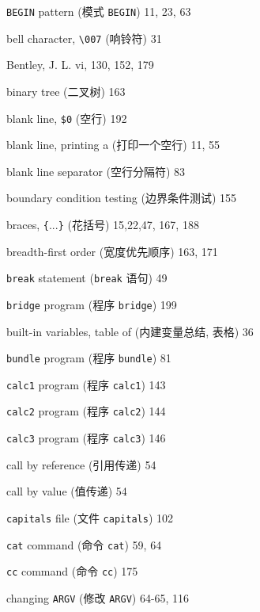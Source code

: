 \begin{multicols}{2}
\hangindent=2pc  \verb'BEGIN' pattern (模式 \verb'BEGIN') 11, 23, 63

\hangindent=2pc  bell character, \verb'\007' (响铃符) 31

\hangindent=2pc  Bentley, J. L. vi, 130, 152, 179

\hangindent=2pc  binary tree (二叉树) 163

\hangindent=2pc  blank line, \verb'$0' (空行) 192

\hangindent=2pc  blank line, printing a (打印一个空行) 11, 55

\hangindent=2pc  blank line separator (空行分隔符) 83

\hangindent=2pc  boundary condition testing (边界条件测试) 155

\hangindent=2pc  braces, \verb'{'...\verb'}' (花括号) 15,22,47, 167, 188

\hangindent=2pc  breadth-first order (宽度优先顺序) 163, 171

\hangindent=2pc  \verb'break' statement (\verb'break' 语句) 49

\hangindent=2pc  \verb'bridge' program (程序 \verb'bridge') 199

\hangindent=2pc  built-in variables, table of (内建变量总结, 
表格) 36

\hangindent=2pc  \verb'bundle' program (程序 \verb'bundle') 81

\hangindent=2pc  \verb'calc1' program (程序 \verb'calc1') 143

\hangindent=2pc  \verb'calc2' program (程序 \verb'calc2') 144

\hangindent=2pc  \verb'calc3' program (程序 \verb'calc3') 146

\hangindent=2pc  call by reference (引用传递) 54

\hangindent=2pc  call by value (值传递) 54

\hangindent=2pc  \verb'capitals' file (文件 \verb'capitals') 102

\hangindent=2pc  \verb'cat' command (命令 \verb'cat') 59, 64

\hangindent=2pc  \verb'cc' command (命令 \verb'cc') 175

\hangindent=2pc  changing \verb'ARGV' (修改 \verb'ARGV') 64-65, 116


\end{multicols}
